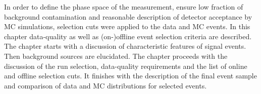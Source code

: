 In order to define the phase space of the measurement, ensure low fraction of background contamination and reasonable description of detector acceptance by MC simulations, selection cuts were applied to the data and MC events. In this chapter data-quality as well as (on-)offline event selection criteria are described. The chapter starts with a discussion of characteristic features of signal events. Then background sources are elucidated. The chapter proceeds with the discussion of the run selection, data-quality requirements and the list of online and offline selection cuts. It finishes with the description of the final event sample and comparison of data and MC distributions for selected events.


